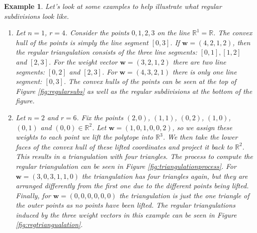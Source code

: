 \documentclass[11pt,reqno,a4paper]{article}
\theoremstyle{theoremstyle}
\theoremstyle{examplestyle}
\newtheorem{example}[theorem]{Example}
\theoremstyle{algorithmstyle}
\numberwithin{equation}{subsection}
\newcommand{\RR}{\mathbb{R}}
\begin{document}
\begin{example}
    Let's look at some examples to help illustrate what regular subdivisions look like.
    \begin{enumerate}
        \item[(1)] Let $n =1$, $r = 4$. Consider the points $0,1,2,3$ on the line $\RR^1 = \RR$. The convex hull of the points is simply the line segment $[0,3]$. If $\mathbf{w} = (4,2,1,2)$, then the regular triangulation consists of the three line segments: $[0,1], [1,2] $ and $[2,3]$. For the weight vector $\mathbf{w} = (3,2,1,2)$ there are two line segments: $[0,2]$ and $[2,3]$. For $\mathbf{w}=(4,3,2,1)$ there is only one line segment: $[0,3]$. The convex hulls of the points can be seen at the top of Figure \ref{fig:regularsubs} as well as the regular subdivisions at the bottom of the figure.

        \item[(2)] Let $n = 2$ and $r = 6$. Fix the points $(2,0)$, $(1,1)$, $(0,2)$, $(1,0)$, $(0,1)$ and $(0,0) \in \RR^2$. Let $\mathbf{w} = (1,0,1,0,0,2)$, so we assign these weights to each point we lift the polytope into $\RR^3$. We then take the lower faces of the convex hull of these lifted coordinates and project it back to $\RR^2$. This results in a triangulation with four triangles. The process to compute the regular triangulation can be seen in Figure \ref{fig:triangulationprocess}. For $\mathbf{w} = (3,0,3,1,1,0)$ the triangulation has four triangles again, but they are arranged differently from the first one due to the different points being lifted. Finally, for $\mathbf{w} = (0,0,0,0,0,0)$ the triangulation is just the one triangle of the outer points as no points have been lifted. The regular triangulations induced by the three weight vectors in this example can be seen in Figure \ref{fig:regtriangualation}.
    \end{enumerate}
\end{example}
\end{document}
